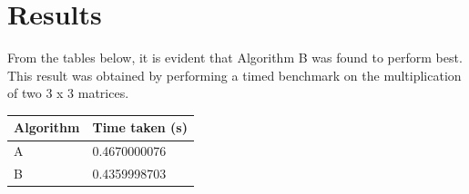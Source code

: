 \documentclass[10pt,twocolumn]{witseiepaper}
\begin{document}
\section{Results}

From the tables below, it is evident that Algorithm B was found to perform best. This result was obtained by performing a timed benchmark on the multiplication of two 3 x 3 matrices.


\begin{tabular}{|l|l|}
	\hline 
	\textbf{Algorithm} & \textbf{Time taken (s)} \\ 
	\hline 
	 A & 0.4670000076 \\ 
	\hline 
	 B & 0.4359998703 \\ 
	\hline 
\end{tabular} 





\end{document}
